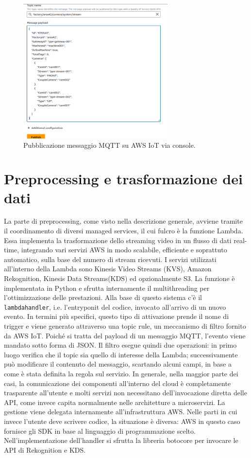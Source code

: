 \begin{figure}[htbp]
    \centering
    \includegraphics[width=0.7\textwidth]{figures/publish-example.png}
    \caption{Pubblicazione messaggio MQTT su AWS IoT via console.} 
    \label{fig:IoT-publish}
\end{figure}

 
\section{Preprocessing e trasformazione dei dati}
La parte di preprocessing, come visto nella descrizione generale, avviene tramite il coordinamento di diversi managed services, il cui fulcro è la funzione Lambda. Essa implementa la trasformazione dello streaming video in un flusso di dati real-time, integrando vari servizi AWS in modo scalabile, efficiente e soprattuto automatico, sulla base del numero di stream ricevuti. I servizi utilizzati all'interno della Lambda sono Kinesis Video Streams (KVS), Amazon Rekognition, Kinesis Data Streams(KDS) ed opzionalmente S3. La funzione è implementata in Python e sfrutta internamente il multithreading per l'ottimizzazione delle prestazioni. Alla base di questo sistema c'è il \texttt{lambda\textunderscore handler}, i.e. l'entryponit del codice, invocato all’arrivo di un nuovo evento. In termini più specifici, questo tipo di attivazione prende il nome di trigger e viene generato attraverso una topic rule, un meccanismo di filtro fornito da AWS IoT. Poiché si tratta del payload di un messaggio MQTT, l'evento viene mandato sotto forma di JSON. Il filtro esegue quindi due operazioni: in primo luogo verifica che il topic sia quello di interesse della Lambda; successivamente può modificare il contenuto del messaggio, scartando alcuni campi, in base a come è stata definita la regola sul servizio. In generale, nella maggior parte dei casi, la comunicazione dei componenti all'interno del cloud è completamente trasparente all'utente e molti servizi non necessitano dell'invocazione diretta delle API, come invece capita normalmente nelle architetture a microservizi. La gestione viene delegata internamente all'infrastruttura AWS. Nelle parti in cui invece l'utente deve scrivere codice, la situazione è diversa: AWS in questo caso fornisce gli SDK in base al linguaggio di programmazione scelto. Nell'implementazione dell'handler si sfrutta la libreria botocore per invocare le API di Rekognition e KDS.

